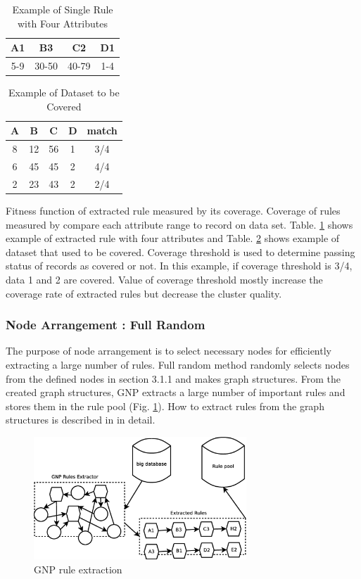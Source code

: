 \documentclass[fleqn,10pt,twocolumn]{SICE14}
\begin{document}
\begin{table}[tb]
\caption{\label{rule-example}Example of Single Rule with Four Attributes}
\begin{center}
\begin{tabular}{|c|c|c|c|}
\hline 
A1 & B3 & C2 & D1\tabularnewline
\hline 
5-9 & 30-50 & 40-79 & 1-4\tabularnewline
\hline 
\end{tabular}
\end{center}
\end{table}

\begin{table}[tb]
\caption{\label{dataset-example}Example of Dataset to be Covered}
\begin{center}
\begin{tabular}{|c|c|c|c|c|}
\hline 
A & B & C & D & match\tabularnewline
\hline 
8 & 12 & 56 & 1 & 3/4\tabularnewline
\hline 
6 & 45 & 45 & 2 & 4/4\tabularnewline
\hline 
2 & 23 & 43 & 2 & 2/4\tabularnewline
\hline 
\end{tabular}
\end{center}
\end{table}

Fitness function of extracted rule measured by its coverage. Coverage of rules measured by compare each attribute range to record on data set. Table. \ref{rule-example} shows example of extracted rule with four attributes and Table. \ref{dataset-example} shows example of dataset that used to be covered. Coverage threshold is used to determine passing status of records as covered or not. In this example, if coverage threshold is 3/4, data 1 and 2 are covered. Value of coverage threshold mostly increase the coverage rate of extracted rules but decrease the cluster quality.

\subsubsection{Node Arrangement : Full Random}
The purpose of node arrangement is to select necessary nodes for efficiently extracting a large number of rules. Full random method randomly selects nodes from the defined nodes in section 3.1.1 and makes graph structures. From the created graph structures, GNP extracts a large number of important rules and stores them in the rule pool (Fig. \ref{gnp_rulepool}). How to extract rules from the graph structures is described in \cite{gnp2} in detail.

\begin{figure}
\includegraphics[width=8cm]{gnp_rulepool}
\caption{\label{gnp_rulepool} GNP rule extraction}
\end{figure}
\end{document}
